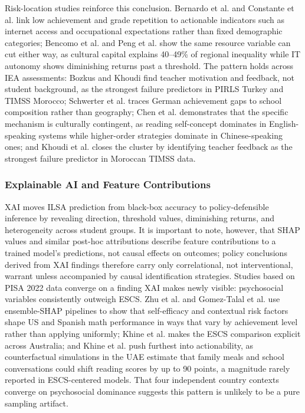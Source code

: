 \documentclass{ieeeaccess}
\begin{document}
Risk-location studies reinforce this conclusion. Bernardo et al. \cite{bernardo-etal2022} and Constante et al. \cite{constante-etal2024} link low achievement and grade repetition to actionable indicators such as internet access and occupational expectations rather than fixed demographic categories; Bencomo et al. \cite{bencomo-etal2024} and Peng et al. \cite{peng-etal2023} show the same resource variable can cut either way, as cultural capital explains 40--49\% of regional inequality while IT autonomy shows diminishing returns past a threshold. The pattern holds across IEA assessments: Bozkus \cite{bozkus2024} and Khoudi \cite{khoudi2024b} find teacher motivation and feedback, not student background, as the strongest failure predictors in PIRLS Turkey and TIMSS Morocco; Schwerter et al. \cite{schwerter-etal2025} traces German achievement gaps to school composition rather than geography; Chen et al. \cite{chen-etal2021} demonstrates that the specific mechanism is culturally contingent, as reading self-concept dominates in English-speaking systems while higher-order strategies dominate in Chinese-speaking ones; and Khoudi et al. \cite{khoudi-etal2024a} closes the cluster by identifying teacher feedback as the strongest failure predictor in Moroccan TIMSS data.

\subsubsection{Explainable AI and Feature Contributions}\label{subsubsec4.1.4}

XAI moves ILSA prediction from black-box accuracy to policy-defensible inference by revealing direction, threshold values, diminishing returns, and heterogeneity across student groups. It is important to note, however, that SHAP values and similar post-hoc attributions describe feature contributions to a trained model's predictions, not causal effects on outcomes; policy conclusions derived from XAI findings therefore carry only correlational, not interventional, warrant unless accompanied by causal identification strategies. Studies based on PISA 2022 data converge on a finding XAI makes newly visible: psychosocial variables consistently outweigh ESCS. Zhu et al. \cite{zhu-etal2025} and Gomez-Talal et al. \cite{gomez-talal-etal2025} use ensemble-SHAP pipelines to show that self-efficacy and contextual risk factors shape US and Spanish math performance in ways that vary by achievement level rather than applying uniformly; Khine et al. \cite{khine-etal2024} makes the ESCS comparison explicit across Australia; and Khine et al. \cite{khine-etal2025} push furthest into actionability, as counterfactual simulations in the UAE estimate that family meals and school conversations could shift reading scores by up to 90 points, a magnitude rarely reported in ESCS-centered models. That four independent country contexts converge on psychosocial dominance suggests this pattern is unlikely to be a pure sampling artifact.
\end{document}
